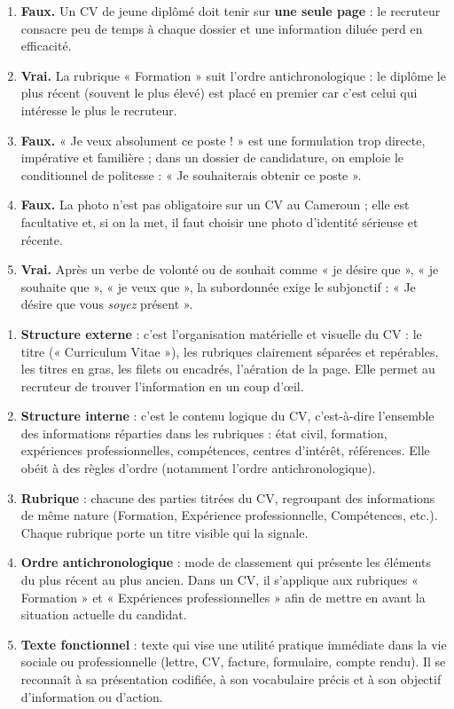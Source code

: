 \documentclass[11pt]{article}
\newcommand{\cle}[1]{{\popxbold\color{popdark}#1}}
\begin{document}
\begin{corrige}
\begin{enumerate}
\item \textbf{Faux.} Un CV de jeune diplômé doit tenir sur \textbf{une seule page} : le recruteur consacre peu de temps à chaque dossier et une information diluée perd en efficacité.
\item \textbf{Vrai.} La rubrique « Formation » suit l'ordre antichronologique : le diplôme le plus récent (souvent le plus élevé) est placé en premier car c'est celui qui intéresse le plus le recruteur.
\item \textbf{Faux.} « Je veux absolument ce poste ! » est une formulation trop directe, impérative et familière ; dans un dossier de candidature, on emploie le conditionnel de politesse : « Je souhaiterais obtenir ce poste ».
\item \textbf{Faux.} La photo n'est pas obligatoire sur un CV au Cameroun ; elle est facultative et, si on la met, il faut choisir une photo d'identité sérieuse et récente.
\item \textbf{Vrai.} Après un verbe de volonté ou de souhait comme « je désire que », « je souhaite que », « je veux que », la subordonnée exige le \cle{subjonctif} : « Je désire que vous \emph{soyez} présent ».
\end{enumerate}
\end{corrige}

\begin{corrige}
\begin{enumerate}
\item \textbf{Structure externe} : c'est l'organisation matérielle et visuelle du CV : le titre (« Curriculum Vitae »), les rubriques clairement séparées et repérables, les titres en gras, les filets ou encadrés, l'aération de la page. Elle permet au recruteur de trouver l'information en un coup d'œil.
\item \textbf{Structure interne} : c'est le contenu logique du CV, c'est-à-dire l'ensemble des informations réparties dans les rubriques : état civil, formation, expériences professionnelles, compétences, centres d'intérêt, références. Elle obéit à des règles d'ordre (notamment l'ordre antichronologique).
\item \textbf{Rubrique} : chacune des parties titrées du CV, regroupant des informations de même nature (Formation, Expérience professionnelle, Compétences, etc.). Chaque rubrique porte un titre visible qui la signale.
\item \textbf{Ordre antichronologique} : mode de classement qui présente les éléments du plus récent au plus ancien. Dans un CV, il s'applique aux rubriques « Formation » et « Expériences professionnelles » afin de mettre en avant la situation actuelle du candidat.
\item \textbf{Texte fonctionnel} : texte qui vise une utilité pratique immédiate dans la vie sociale ou professionnelle (lettre, CV, facture, formulaire, compte rendu). Il se reconnaît à sa présentation codifiée, à son vocabulaire précis et à son objectif d'information ou d'action.
\end{enumerate}
\end{corrige}
\end{document}
